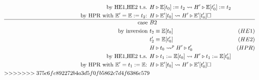 \documentclass{article}
\begin{document}
\begin{enumerate}
\begin{align*}
            \text{by HE1,HE2 t.s. } & H\triangleright \mathbb{E}[t_0]:=t_2 \leadsto H'\triangleright \mathbb{E}[t_0']:=t_2 \\
            \text{by HPR with $\mathbb{E}'=\mathbb{E}:=t_2$: } & H\triangleright\mathbb{E}'[t_0]\leadsto H'\triangleright \mathbb{E}'[t_0'] \square \\
            \hline
            \text{case } & B2 \\
            \text{by inversion } & t_2 \equiv \mathbb{E}[t_0] & (HE1) \\
                                 & t_2'\equiv \mathbb{E}[t_0'] & (HE2) \\
                                 & H\triangleright t_0 \leadsto^p H'\triangleright t_0' & (HPR) \\
            \text{by HE1,HE2 t.s. } & H\triangleright t_1:=\mathbb{E}[t_0] \leadsto H'\triangleright t_1:=\mathbb{E}[t_0'] \\
            \text{by HPR with $\mathbb{E}'=t_1:=\mathbb{E}$: } & H\triangleright\mathbb{E}'[t_0]\leadsto H'\triangleright \mathbb{E}'[t_0'] \square \\
>>>>>>> 375c6fe892272b4a3d5f0fb5862c7d4f6386e579
        \end{align*}
\end{enumerate}

\newpage
\end{document}
